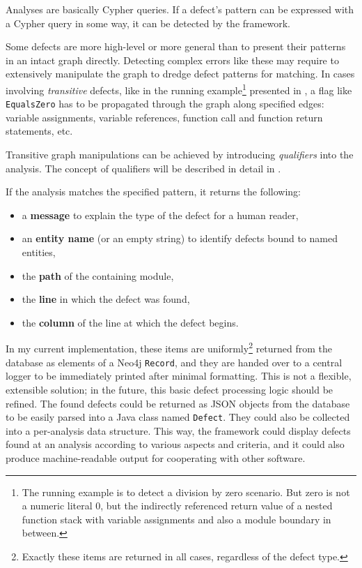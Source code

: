 Analyses are basically Cypher queries. If a defect's pattern can be expressed with a Cypher query in some way, it can be detected by the framework.

Some defects are more high-level or more general than to present their patterns in an intact graph directly. Detecting complex errors like these may require to extensively manipulate the graph to dredge defect patterns for matching. In cases involving \emph{transitive} defects, like in the running example\footnote{The running example is to detect a division by zero scenario. But zero is not a numeric literal $0$, but the indirectly referenced return value of a nested function stack with variable assignments and also a module boundary in between.} presented in , a flag like \lstinline{EqualsZero} has to be propagated through the graph along specified edges: variable assignments, variable references, function call and function return statements, etc.

Transitive graph manipulations can be achieved by introducing \emph{qualifiers} into the analysis. The concept of qualifiers will be described in detail in .

If the analysis matches the specified pattern, it returns the following:

\begin{itemize}
\item a \textbf{message} to explain the type of the defect for a human reader,
\item an \textbf{entity name} (or an empty string) to identify defects bound to named entities,
\item the \textbf{path} of the containing module,
\item the \textbf{line} in which the defect was found,
\item the \textbf{column} of the line at which the defect begins.
\end{itemize}

In my current implementation, these items are uniformly\footnote{Exactly these items are returned in all cases, regardless of the defect type.} returned from the database as elements of a Neo4j \lstinline{Record}, and they are handed over to a central logger to be immediately printed after minimal formatting. This is not a flexible, extensible solution; in the future, this basic defect processing logic should be refined. The found defects could be returned as JSON objects from the database to be easily parsed into a Java class named \lstinline{Defect}. They could also be collected into a per-analysis data structure. This way, the framework could display defects found at an analysis according to various aspects and criteria, and it could also produce machine-readable output for cooperating with other software.


